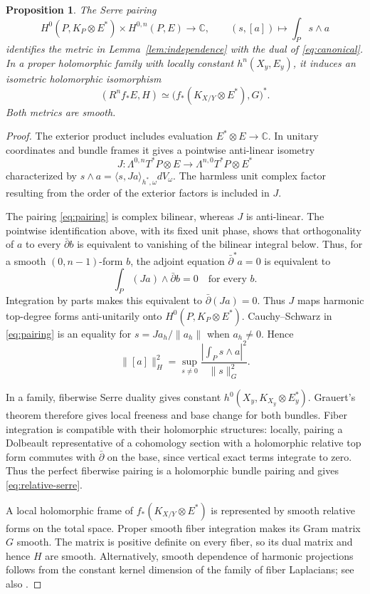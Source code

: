 \documentclass[11pt,reqno]{amsart}
\numberwithin{equation}{section}
\newtheorem{proposition}[theorem]{Proposition}
\theoremstyle{definition}
\theoremstyle{remark}
\newcommand{\db}{\bar\partial}
\newcommand{\ip}[2]{\langle #1,#2\rangle}
\newcommand{\norm}[1]{\lVert #1\rVert}
\newcommand{\C}{\mathbb C}
\begin{document}
\begin{proposition}\label{prop:serre}
The Serre pairing
\begin{equation}\label{eq:pairing}
 H^0(P,K_P\otimes E^*)\times H^{0,n}(P,E)\longrightarrow\C,
 \qquad (s,[a])\longmapsto\int_P s\wedge a
\end{equation}
identifies the metric in Lemma~\ref{lem:independence} with the dual of \eqref{eq:canonical}. In a proper holomorphic family with locally constant $h^n(X_y,E_y)$, it induces an isometric holomorphic isomorphism
\begin{equation}\label{eq:relative-serre}
 (R^nf_*E,H)\simeq
 \bigl(f_*(K_{X/Y}\otimes E^*),G\bigr)^*.
\end{equation}
Both metrics are smooth.
\end{proposition}
\begin{proof}
The exterior product includes evaluation $E^*\otimes E\to\C$. In unitary coordinates and bundle frames it gives a pointwise anti-linear isometry
\[
 J:\Lambda^{0,n}T^*P\otimes E\longrightarrow
   \Lambda^{n,0}T^*P\otimes E^*
\]
characterized by $s\wedge a=\ip{s}{Ja}_{h^*,\omega}dV_\omega$. The harmless unit complex factor resulting from the order of the exterior factors is included in $J$.

The pairing \eqref{eq:pairing} is complex bilinear, whereas $J$ is anti-linear. The pointwise identification above, with its fixed unit phase, shows that orthogonality of $a$ to every $\db b$ is equivalent to vanishing of the bilinear integral below. Thus, for a smooth $(0,n-1)$-form $b$, the adjoint equation $\db^*a=0$ is equivalent to
\[
 \int_P (Ja)\wedge\db b=0\quad\text{for every }b.
\]
Integration by parts makes this equivalent to $\db(Ja)=0$. Thus $J$ maps harmonic top-degree forms anti-unitarily onto $H^0(P,K_P\otimes E^*)$. Cauchy--Schwarz in \eqref{eq:pairing} is an equality for $s=Ja_h/\norm{a_h}$ when $a_h\ne0$. Hence
\begin{equation}\label{eq:dual-norm}
 \norm{[a]}_H^2
 =\sup_{s\ne0}\frac{\left|\int_Ps\wedge a\right|^2}{\norm{s}_G^2}.
\end{equation}

In a family, fiberwise Serre duality gives constant $h^0(X_y,K_{X_y}\otimes E_y^*)$. Grauert's theorem \cite{Gra60} therefore gives local freeness and base change for both bundles. Fiber integration is compatible with their holomorphic structures: locally, pairing a Dolbeault representative of a cohomology section with a holomorphic relative top form commutes with $\db$ on the base, since vertical exact terms integrate to zero. Thus the perfect fiberwise pairing is a holomorphic bundle pairing and gives \eqref{eq:relative-serre}.

A local holomorphic frame of $f_*(K_{X/Y}\otimes E^*)$ is represented by smooth relative forms on the total space. Proper smooth fiber integration makes its Gram matrix $G$ smooth. The matrix is positive definite on every fiber, so its dual matrix and hence $H$ are smooth. Alternatively, smooth dependence of harmonic projections follows from the constant kernel dimension of the family of fiber Laplacians; see also \cite[Lemma 2.8]{BPW22}.
\end{proof}
\end{document}
